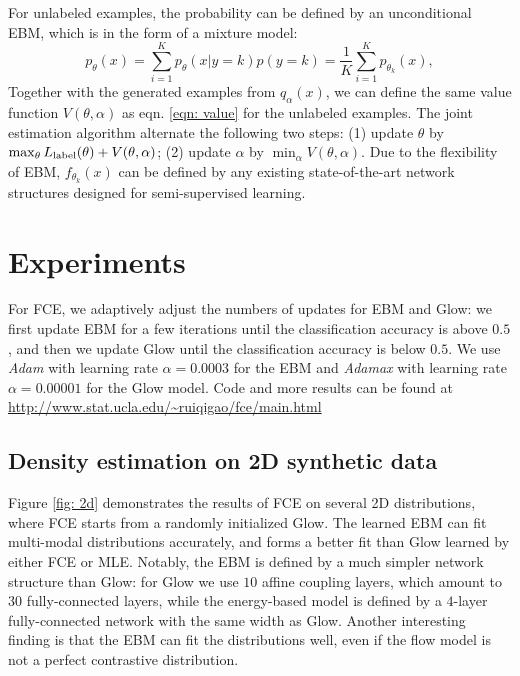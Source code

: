 \documentclass[10pt,twocolumn,letterpaper]{article}
\begin{document}
For unlabeled examples, the probability can be defined by an unconditional EBM, which is in the form of a mixture model:
\begin{equation}
	p_\theta(x) =\sum_{i=1}^K p_\theta(x|y=k) p(y=k) = \frac{1}{K} \sum_{i=1}^K p_{\theta_k}(x),
\end{equation}
Together with the generated examples from $q_\alpha(x)$, we can define the same value function $V(\theta, \alpha)$ as eqn. \ref{eqn: value} for the unlabeled examples. The joint estimation algorithm alternate the following two steps: (1) update $\theta$ by $\max_\theta L_{\rm label}(\theta) + V(\theta, \alpha)$; (2) update $\alpha$ by $\min_\alpha V(\theta, \alpha)$. Due to the flexibility of EBM, $f_{\theta_k}(x)$ can be defined by any existing state-of-the-art network structures designed for semi-supervised learning. 
\section{Experiments}


For FCE, we adaptively adjust the numbers of updates for EBM and Glow: we first update EBM for a few iterations until the classification accuracy is above $0.5$, and then we update Glow until the classification accuracy is below $0.5$. We use \emph{Adam} \cite{kingma2014adam} with learning rate $\alpha=0.0003$ for the EBM and \emph{Adamax} \cite{kingma2014adam} with learning rate $\alpha=0.00001$ for the Glow model. Code and more results can be found at {\small \url{http://www.stat.ucla.edu/~ruiqigao/fce/main.html}}

\subsection{Density estimation on 2D synthetic data}
Figure \ref{fig: 2d} demonstrates the results of FCE on several 2D distributions, where FCE starts from a randomly initialized Glow. The learned EBM can fit multi-modal distributions accurately, and forms a better fit than Glow learned by either FCE or MLE. Notably, the EBM is defined by a much simpler network structure than Glow: for Glow we use $10$ affine coupling layers, which amount to $30$ fully-connected layers, while the energy-based model is defined by a $4$-layer fully-connected network with the same width as Glow.  Another interesting finding is that the EBM can fit the distributions well, even if the flow model is not a perfect contrastive distribution.
\end{document}
